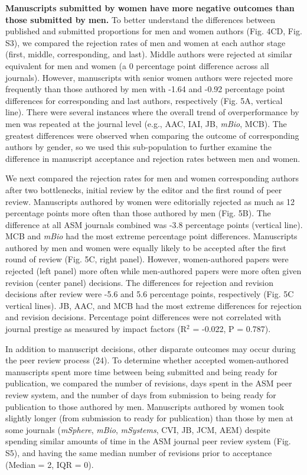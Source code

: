 \documentclass[11pt,]{article}
\begin{document}
\textbf{Manuscripts submitted by women have more negative outcomes than
those submitted by men.} To better understand the differences between
published and submitted proportions for men and women authors (Fig. 4CD,
Fig. S3), we compared the rejection rates of men and women at each
author stage (first, middle, corresponding, and last). Middle authors
were rejected at similar equivalent for men and women (a 0 percentage
point difference across all journals). However, manuscripts with senior
women authors were rejected more frequently than those authored by men
with -1.64 and -0.92 percentage point differences for corresponding and
last authors, respectively (Fig. 5A, vertical line). There were several
instances where the overall trend of overperformance by men was repeated
at the journal level (e.g., AAC, IAI, JB, \emph{mBio}, MCB). The
greatest differences were observed when comparing the outcome of
corresponding authors by gender, so we used this sub-population to
further examine the difference in manuscript acceptance and rejection
rates between men and women.

We next compared the rejection rates for men and women corresponding
authors after two bottlenecks, initial review by the editor and the
first round of peer review. Manuscripts authored by women were
editorially rejected as much as 12 percentage points more often than
those authored by men (Fig. 5B). The difference at all ASM journals
combined was -3.8 percentage points (vertical line). MCB and \emph{mBio}
had the most extreme percentage point differences. Manuscripts authored
by men and women were equally likely to be accepted after the first
round of review (Fig. 5C, right panel). However, women-authored papers
were rejected (left panel) more often while men-authored papers were
more often given revision (center panel) decisions. The differences for
rejection and revision decisions after review were -5.6 and 5.6
percentage points, respectively (Fig. 5C vertical lines). JB, AAC, and
MCB had the most extreme differences for rejection and revision
decisions. Percentage point differences were not correlated with journal
prestige as measured by impact factors (R\({^2}\) = -0.022, P = 0.787).

In addition to manuscript decisions, other disparate outcomes may occur
during the peer review process (24). To determine whether accepted
women-authored manuscripts spent more time between being submitted and
being ready for publication, we compared the number of revisions, days
spent in the ASM peer review system, and the number of days from
submission to being ready for publication to those authored by men.
Manuscripts authored by women took slightly longer (from submission to
ready for publication) than those by men at some journals
(\emph{mSphere}, \emph{mBio}, \emph{mSystems}, CVI, JB, JCM, AEM)
despite spending similar amounts of time in the ASM journal peer review
system (Fig. S5), and having the same median number of revisions prior
to acceptance (Median = 2, IQR = 0).
\end{document}
